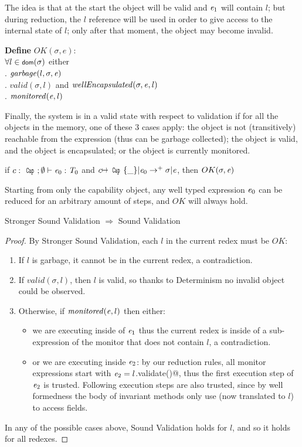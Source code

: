 The idea is that at the start the object will be valid and ${\mathit{e}}_1$ will contain $l$;
but during reduction, the $l$ reference will be used in order to
give access to the internal state of $l$; only after that moment, the object may become invalid.


\noindent\textbf{Define} $OK(\sigma,e)$:\\
\indent $\forall l\in\dom(\sigma)$
  either\\
\indent{}. $\mathit{garbage}(l,\sigma,\e)$\\
\indent{}. $\mathit{valid}(\sigma,l)$ and $\mathit{wellEncapsulated}(\sigma,\e,l)$\\
\indent{}. $\mathit{monitored}({\mathit{e}},l)$

Finally, the system is in a valid state with respect to validation
if for all the objects in the memory, one of these 3 cases apply:
the object is not (transitively) reachable from the expression (thus can be garbage collected);
the object is valid, and the object is encapsulated;
or the object is currently monitored.

\begin{theorem}
if $c:\Kw{Cap};\emptyset\vdash \e_0: \T_0$ and
$c\mapsto\Kw{Cap}\{\_\}|\e_0\rightarrow^+ \sigma|\e$, then
$OK(\sigma,\e)$
\end{theorem}
\noindent Starting from only the capability object,
any well typed expression ${\mathit{e}}_0$ can be reduced for an arbitrary amount of steps,
and $OK$ will always hold.
\\
\begin{theorem} Stronger Sound Validation $\Rightarrow$ Sound Validation
\end{theorem}
\begin{proof}
\noindent By Stronger Sound Validation, each $l$ in the current redex must be $OK$:
\begin{enumerate}
	\item If $l$ is garbage, it cannot be in the current redex, a contradiction.
	\item If $\mathit{valid}(\sigma,l)$, then $l$ is valid, so thanks to Determinism
	no invalid object could be observed.
	\item Otherwise, if $\mathit{monitored}({\mathit{e}},l)$ then either:
	\begin{itemize}
	 \item we are executing inside of ${\mathit{e}}_1$ thus the current redex is inside of a sub-expression of the monitor that does not contain $l$, a contradiction.
	 \item or we are executing inside ${\mathit{e}}_2$:
	 by our reduction rules, all monitor expressions start with 
	 ${\mathit{e}}_2=l$\Q@.validate()@, thus the first execution step
	 of ${\mathit{e}}_2$ is trusted. Following execution steps are also trusted, since by well formedness the body of invariant methods only use \Q@this@ (now translated to $l$) to access fields.
	\end{itemize}
\end{enumerate}
In any of the possible cases above, Sound Validation holds for $l$, and so it holds for all redexes.
\end{proof}

